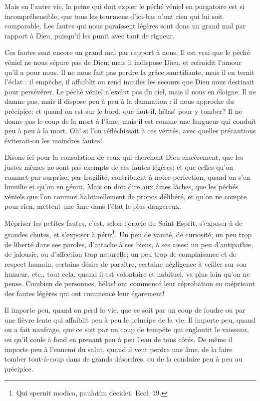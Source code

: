 \documentclass[instructions.tex]{subfiles}
\begin{document}
Mais en l'autre vie, la peine qui doit expier le péché véniel en purgatoire est si incompréhensible, que tous les tourmens d'ici-bas n'ont rien qui lui soit comparable. Les fautes qui nous paraissent légères sont donc un grand mal par rapport à Dieu, puisqu'il les punit avec tant de rigueur.

\secundo Ces fautes sont encore un grand mal par rapport à nous. Il est vrai que le péché véniel ne nous sépare pas de Dieu; mais il indispose Dieu, et refroidit l'amour qu'il a pour nous. Il ne nous fait pas perdre la grâce sanctifiante, mais il en ternit l'éclat : il empêche, il affaiblit ou rend inutiles les secours que Dieu nous destinait pour persévérer. Le péché véniel n'exclut pas du ciel, mais il nous en éloigne. Il ne damne pas, mais il dispose peu à peu à la damnation : il nous approche du précipice; et quand on est sur le bord, que faut-il, hélas! pour y tomber? Il ne donne pas le coup de la mort à l'âme, mais il est comme une langueur qui conduit peu à peu à la mort. Oh! si l'on réfléchissait à ces vérités, avec quelles précautions éviterait-on les moindres fautes!

Disons ici pour la consolation de ceux qui cherchent Dieu sincèrement, que les justes mêmes ne sont pas exempts de ces fautes légères; et que celles qu'on commet par surprise, par fragilité, contribuent à notre perfection, quand on s'en humilie et qu'on en gémit. Mais on doit dire aux âmes lâches, que les péchés véniels que l'on commet habituellement de propos délibéré, et qu'on ne compte pour rien, mettent une âme dans l'état le plus dangereux.

Mépriser les petites fautes, c'est, selon l'oracle du Saint-Esprit, s'exposer à de grandes chutes, et s'exposer à périr\footnote{Qui spernit modica, paulatim decidet. Eccl. 19.}. Un peu de vanité, de curiosité; un peu trop de liberté dans ses paroles, d'attache à ses biens, à ses aises; un peu d'antipathie, de jalousie, ou d'affection trop naturelle; un peu trop de complaisance et de respect humain; certains désirs de paraître, certaine négligence à veiller sur son humeur, etc., tout cela, quand il est volontaire et habituel, va plus loin qu'on ne pense. Combien de personnes, hélas! ont commencé leur réprobation en méprisant des fautes légères qui ont commencé leur égarement!

Il importe peu, quand on perd la vie, que ce soit par un coup de foudre ou par une fièvre lente qui affaiblit peu à peu le principe de la vie. Il importe peu, quand on a fait naufrage, que ce soit par un coup de tempête qui engloutit le vaisseau, ou qu'il coule à fond en prenant peu à peu l'eau de tous côtés. De même il importe peu à l'ennemi du salut, quand il veut perdre une âme, de la faire tomber tout-à-coup dans de grands désordres, ou de la conduire peu à peu au précipice.
\end{document}

